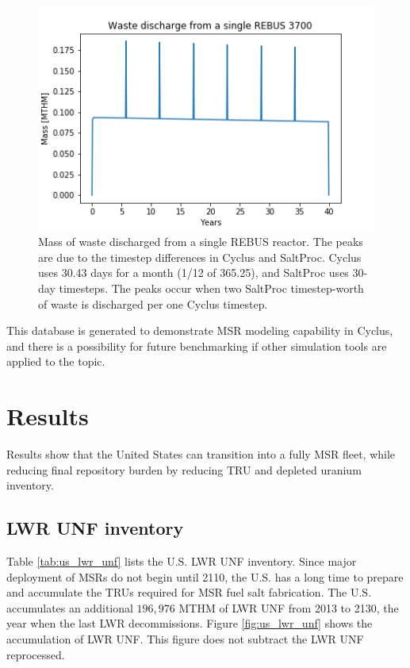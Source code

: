 \begin{figure}[htbp!]
	\begin{center}
		\includegraphics[scale=0.7]{./images/us/rebus_waste.png}
	\end{center}
	\caption{Mass of waste discharged from a single REBUS reactor. The peaks
		are due to the timestep differences in Cyclus and SaltProc. Cyclus
		uses 30.43 days for a month (1/12 of 365.25), and SaltProc uses 30-day
		timesteps. The peaks occur when two SaltProc timestep-worth of waste is discharged
		per one Cyclus timestep.
	}
	\label{fig:rebus_waste}
\end{figure}

This database is generated to demonstrate \gls{MSR} modeling capability in Cyclus,
and there is a possibility for future benchmarking if other simulation tools are
applied to the topic.


\FloatBarrier


\section{Results}
Results show that the United States can transition into a
fully \gls{MSR} fleet, while reducing final repository
burden by reducing \gls{TRU} and depleted uranium
inventory.

\subsection{\gls{LWR} \gls{UNF} inventory}

Table \ref{tab:us_lwr_unf} lists the U.S. \gls{LWR} \gls{UNF} inventory.
Since major deployment of \glspl{MSR} do not begin until 2110,
the U.S. has a long time to prepare and accumulate the \glspl{TRU}
required for \gls{MSR} fuel salt fabrication. The U.S. accumulates
an additional $196,976$ \gls{MTHM} of \gls{LWR} \gls{UNF}
from 2013 to 2130, the year when the last \gls{LWR} decommissions.
Figure \ref{fig:us_lwr_unf} shows the accumulation of \gls{LWR} \gls{UNF}.
This figure does not subtract the \gls{LWR} \gls{UNF} reprocessed.


